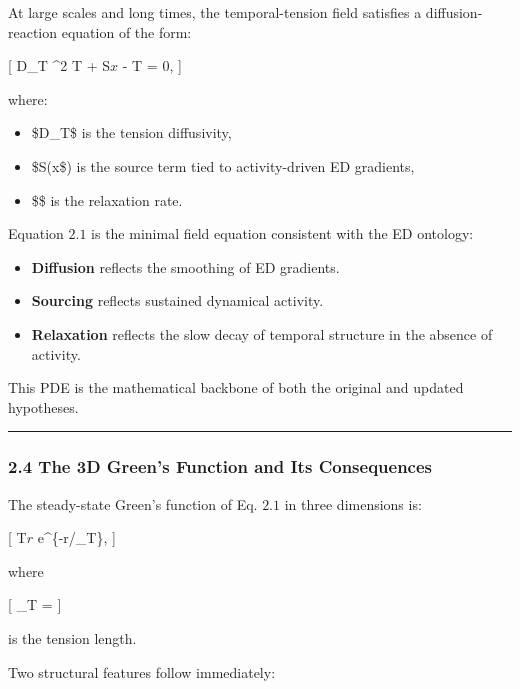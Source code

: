 At large scales and long times, the temporal-tension field satisfies a
diffusion-reaction equation of the form:

{[} D\_T \nabla\^{}2 T + S\(x\) - \chi T = 0,  {]}

where:

\begin{itemize}
\tightlist
\item
  \$D\_T\$ is the tension diffusivity,\\
\item
  \$S(x\$) is the source term tied to activity-driven ED gradients,\\
\item
  \$\chi\$ is the relaxation rate.
\end{itemize}

Equation \(2.1\) is the minimal field equation consistent with the ED
ontology:

\begin{itemize}
\tightlist
\item
  \textbf{Diffusion} reflects the smoothing of ED gradients.\\
\item
  \textbf{Sourcing} reflects sustained dynamical activity.\\
\item
  \textbf{Relaxation} reflects the slow decay of temporal structure in
  the absence of activity.
\end{itemize}

This PDE is the mathematical backbone of both the original and updated
hypotheses.

\begin{center}\rule{0.5\linewidth}{0.5pt}\end{center}

\subsubsection{2.4 The 3D Green's Function and Its
Consequences}\label{the-3d-greens-function-and-its-consequences}

The steady-state Green's function of Eq. \(2.1\) in three dimensions is:

{[} T\(r\) \propto {} e\^{}\{-r/\ell\_T\},  {]}

where

{[} \ell\_T =   {]}

is the tension length.

Two structural features follow immediately:

